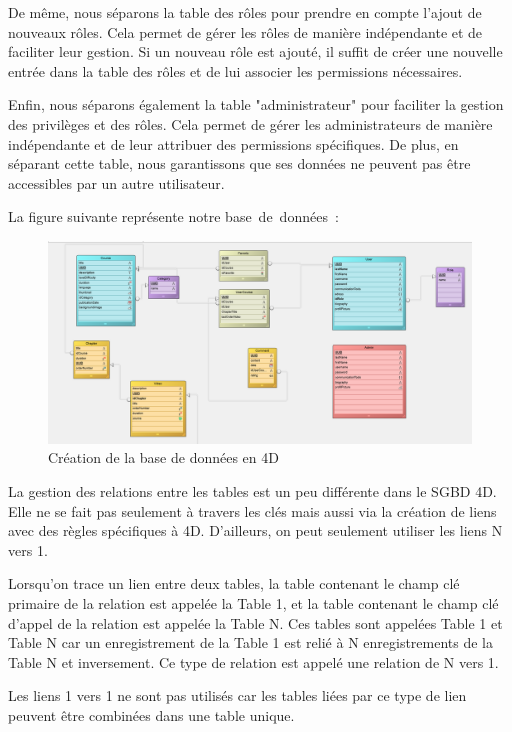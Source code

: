 De même, nous séparons la table des rôles pour prendre en compte l’ajout de nouveaux rôles. Cela permet de gérer les rôles de manière indépendante et de faciliter leur gestion. Si un nouveau rôle est ajouté, il suffit de créer une nouvelle entrée dans la table des rôles et de lui associer les permissions nécessaires.

Enfin, nous séparons également la table "administrateur" pour faciliter la gestion des privilèges et des rôles. Cela permet de gérer les administrateurs de manière indépendante et de leur attribuer des permissions spécifiques. De plus, en séparant cette table, nous garantissons que ses données ne peuvent pas être accessibles par un autre utilisateur.

La figure suivante représente notre base de données :

\begin{figure}[H]
    \centering
\includegraphics[width=19cm]{Figures/database.PNG}

    \caption{Création de la base de données en 4D}
\end{figure}

La gestion des relations entre les tables est un peu différente dans le SGBD 4D. Elle ne se fait pas seulement à travers les clés mais aussi via la création de liens avec des règles spécifiques à 4D. D’ailleurs, on peut seulement utiliser les liens N vers 1.

Lorsqu’on trace un lien entre deux tables, la table contenant le champ clé primaire de la relation est appelée la Table 1, et la table contenant le champ clé d’appel de la relation est appelée la Table N. Ces tables sont appelées Table 1 et Table N car un enregistrement de la Table 1 est relié à N enregistrements de la Table N et inversement. Ce type de relation est appelé une relation de N vers 1.

Les liens 1 vers 1 ne sont pas utilisés car les tables liées par ce type de lien peuvent être combinées dans une table unique.

